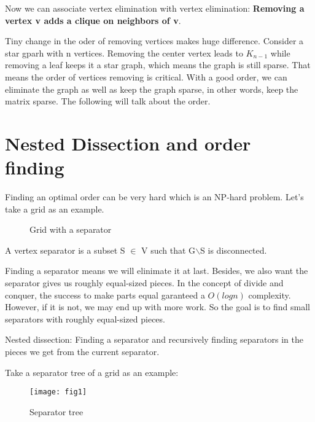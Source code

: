 \documentclass{article}
\begin{document}
    Now we can associate vertex elimination with vertex elimination:
    \textbf{Removing a vertex v adds a clique on neighbors of v}.
    
    
    Tiny change in the oder of removing vertices makes huge difference. Consider a star gparh with n vertices. Removing the center vertex leads to $K_{n-1}$ while removing a leaf keeps it a star graph, which means the graph is still sparse. That means the order of vertices removing is critical. With a good order, we can eliminate the graph as well as keep the graph sparse, in other words, keep the matrix sparse. The following will talk about the order.
    
    \section{Nested Dissection and order finding}
    Finding an optimal order can be very hard which is an NP-hard problem. Let's take a grid as an example.
    \begin{figure}[h!]
    	\begin{center}
    	\end{center}
    	\caption{Grid with a separator}
    \end{figure}
	\begin{definition}
		A vertex separator is a subset S $\in$ V such that G$\backslash$S is disconnected.
	\end{definition}
	Finding a separator means we will elinimate it at last. Besides, we also want the separator gives us roughly equal-sized pieces. In the concept of divide and conquer, the success to make parts equal garanteed a $O(logn)$ complexity. However, if it is not, we may end up with more work. So the goal is to find small separators with roughly equal-sized pieces.
	\begin{definition}
		Nested dissection: Finding a separator and recursively finding separators in the pieces we get from the current separator.
	\end{definition}
	Take a separator tree of a grid as an example:
	
	\begin{figure}[h!]
		\begin{center}
			\texttt{[image: fig1]}
		\end{center}
		\caption{Separator tree}
	\end{figure}
\end{document}
